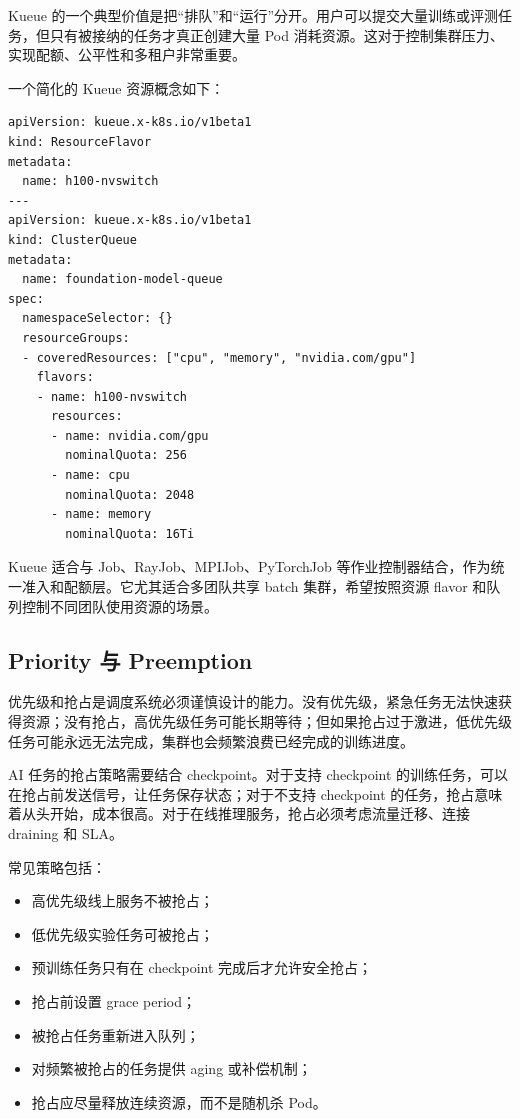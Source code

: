 Kueue 的一个典型价值是把“排队”和“运行”分开。用户可以提交大量训练或评测任务，但只有被接纳的任务才真正创建大量 Pod 消耗资源。这对于控制集群压力、实现配额、公平性和多租户非常重要。

一个简化的 Kueue 资源概念如下：

\begin{lstlisting}[caption={Kueue ClusterQueue 与 ResourceFlavor 的概念示例},label={lst:kueue-clusterqueue-example}]
apiVersion: kueue.x-k8s.io/v1beta1
kind: ResourceFlavor
metadata:
  name: h100-nvswitch
---
apiVersion: kueue.x-k8s.io/v1beta1
kind: ClusterQueue
metadata:
  name: foundation-model-queue
spec:
  namespaceSelector: {}
  resourceGroups:
  - coveredResources: ["cpu", "memory", "nvidia.com/gpu"]
    flavors:
    - name: h100-nvswitch
      resources:
      - name: nvidia.com/gpu
        nominalQuota: 256
      - name: cpu
        nominalQuota: 2048
      - name: memory
        nominalQuota: 16Ti
\end{lstlisting}

Kueue 适合与 Job、RayJob、MPIJob、PyTorchJob 等作业控制器结合，作为统一准入和配额层。它尤其适合多团队共享 batch 集群，希望按照资源 flavor 和队列控制不同团队使用资源的场景。

\subsection{Priority 与 Preemption}
\label{subsec:priority-preemption}

优先级和抢占是调度系统必须谨慎设计的能力。没有优先级，紧急任务无法快速获得资源；没有抢占，高优先级任务可能长期等待；但如果抢占过于激进，低优先级任务可能永远无法完成，集群也会频繁浪费已经完成的训练进度。

AI 任务的抢占策略需要结合 checkpoint。对于支持 checkpoint 的训练任务，可以在抢占前发送信号，让任务保存状态；对于不支持 checkpoint 的任务，抢占意味着从头开始，成本很高。对于在线推理服务，抢占必须考虑流量迁移、连接 draining 和 SLA。

常见策略包括：

\begin{itemize}
  \item 高优先级线上服务不被抢占；
  \item 低优先级实验任务可被抢占；
  \item 预训练任务只有在 checkpoint 完成后才允许安全抢占；
  \item 抢占前设置 grace period；
  \item 被抢占任务重新进入队列；
  \item 对频繁被抢占的任务提供 aging 或补偿机制；
  \item 抢占应尽量释放连续资源，而不是随机杀 Pod。
\end{itemize}

